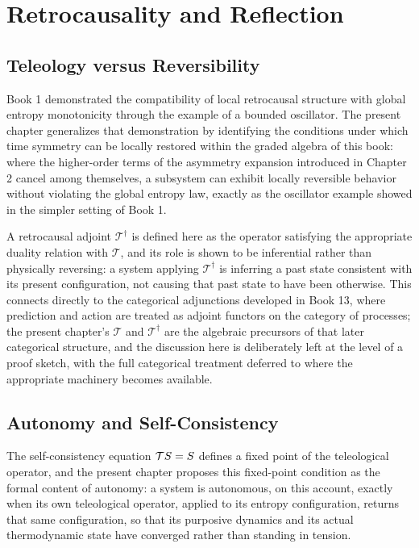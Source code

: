 \part{Retrocausality and Reflection}

\chapter{Teleology versus Reversibility}

Book 1 demonstrated the compatibility of local retrocausal structure with global entropy monotonicity through the example of a bounded oscillator. The present chapter generalizes that demonstration by identifying the conditions under which time symmetry can be locally restored within the graded algebra of this book: where the higher-order terms of the asymmetry expansion introduced in Chapter 2 cancel among themselves, a subsystem can exhibit locally reversible behavior without violating the global entropy law, exactly as the oscillator example showed in the simpler setting of Book 1.

A retrocausal adjoint $\mathcal{T}^\dagger$ is defined here as the operator satisfying the appropriate duality relation with $\mathcal{T}$, and its role is shown to be inferential rather than physically reversing: a system applying $\mathcal{T}^\dagger$ is inferring a past state consistent with its present configuration, not causing that past state to have been otherwise. This connects directly to the categorical adjunctions developed in Book 13, where prediction and action are treated as adjoint functors on the category of processes; the present chapter's $\mathcal{T}$ and $\mathcal{T}^\dagger$ are the algebraic precursors of that later categorical structure, and the discussion here is deliberately left at the level of a proof sketch, with the full categorical treatment deferred to where the appropriate machinery becomes available.

\chapter{Autonomy and Self-Consistency}

The self-consistency equation $\mathcal{T}S = S$ defines a fixed point of the teleological operator, and the present chapter proposes this fixed-point condition as the formal content of autonomy: a system is autonomous, on this account, exactly when its own teleological operator, applied to its entropy configuration, returns that same configuration, so that its purposive dynamics and its actual thermodynamic state have converged rather than standing in tension.

